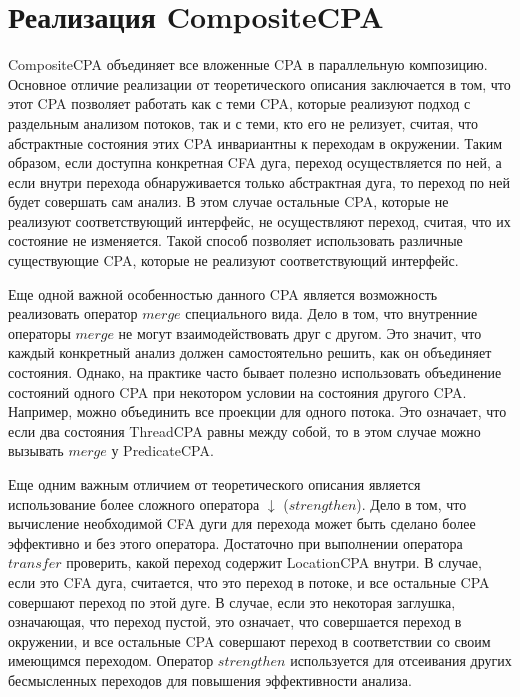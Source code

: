 \section{Реализация CompositeCPA}
\label{sect_impl_composite}

CompositeCPA объединяет все вложенные CPA в параллельную композицию.
Основное отличие реализации от теоретического описания заключается в том, что этот CPA позволяет работать как с теми CPA, которые реализуют подход с раздельным анализом потоков, так и с теми, кто его не релизует, считая, что абстрактные состояния этих CPA инвариантны к переходам в окружении. 
Таким образом, если доступна конкретная CFA дуга, переход осуществляется по ней, а если внутри перехода обнаруживается только абстрактная дуга, то переход по ней будет совершать сам анализ. 
В этом случае остальные CPA, которые не реализуют соответствующий интерфейс, не осуществляют переход, считая, что их состояние не изменяется.
Такой способ позволяет использовать различные существующие CPA, которые не реализуют соответствующий интерфейс.

Еще одной важной особенностью данного CPA является возможность реализовать оператор $merge$ специального вида. 
Дело в том, что внутренние операторы $merge$ не могут взаимодействовать друг с другом. 
Это значит, что каждый конкретный анализ должен самостоятельно решить, как он объединяет состояния.
Однако, на практике часто бывает полезно использовать объединение состояний одного CPA при некотором условии на состояния другого CPA.
Например, можно объединить все проекции для одного потока.
Это означает, что если два состояния ThreadCPA равны между собой, то в этом случае можно вызывать $merge$ у PredicateCPA.

Еще одним важным отличием от теоретического описания является использование более сложного оператора $\downarrow$ ($strengthen$). 
Дело в том, что вычисление необходимой CFA дуги для перехода может быть сделано более эффективно и без этого оператора.
Достаточно при выполнении оператора $transfer$ проверить, какой переход содержит LocationCPA внутри. 
В случае, если это CFA дуга, считается, что это переход в потоке, и все остальные CPA совершают переход по этой дуге.
В случае, если это некоторая заглушка, означающая, что переход пустой, это означает, что совершается переход в окружении, и все остальные CPA совершают переход в соответствии со своим имеющимся переходом.
Оператор $strengthen$ используется для отсеивания других бесмысленных переходов для повышения эффективности анализа.

